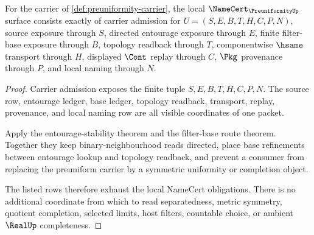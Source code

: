 \begin{theorem}
\label{thm:preuniformity-namecert-obligations}
For the carrier of \autoref{def:preuniformity-carrier}, the local $\NameCert_{\PreuniformityUp}$ surface consists exactly of carrier admission for $U=(S,E,B,T,H,C,P,N)$, source exposure through $S$, directed entourage exposure through $E$, finite filter-base exposure through $B$, topology readback through $T$, componentwise $\hsame$ transport through $H$, displayed $\Cont$ replay through $C$, $\Pkg$ provenance through $P$, and local naming through $N$.
\end{theorem}
\begin{proof}
Carrier admission exposes the finite tuple $S,E,B,T,H,C,P,N$. The source row, entourage ledger, base ledger, topology readback, transport, replay, provenance, and local naming row are all visible coordinates of one packet.

Apply the entourage-stability theorem and the filter-base route theorem. Together they keep binary-neighbourhood reads directed, place base refinements between entourage lookup and topology readback, and prevent a consumer from replacing the preuniform carrier by a symmetric uniformity or completion object.

The listed rows therefore exhaust the local NameCert obligations. There is no additional coordinate from which to read separatedness, metric symmetry, quotient completion, selected limits, host filters, countable choice, or ambient $\RealUp$ completeness.
\end{proof}


\begin{closurestatus}{\PreuniformityUp}
  \theoryclosure{\seedClosure}
  \formalstatus{\unformalizedV}
\end{closurestatus}
